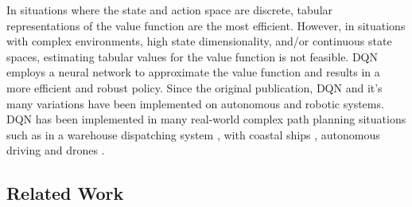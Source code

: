 In situations where the state and action space are discrete, tabular representations of the value function are the most efficient. However, in situations with complex environments, high state dimensionality, and/or continuous state spaces, estimating tabular values for the value function is not feasible. DQN employs a neural network to approximate the value function and results in a more efficient and robust policy. Since the original publication, DQN and it's many variations have been implemented on autonomous and robotic systems. DQN has been implemented in many real-world complex path planning situations such as in a warehouse dispatching system \cite{yang2020multi}, with coastal ships \cite{guo2021path}, autonomous driving \cite{chen2020conditional} and drones \cite{azar2021drone}. 


\subsection{Related Work}

